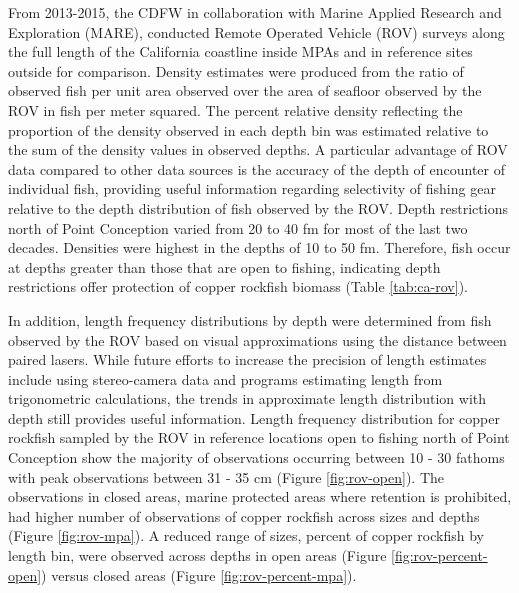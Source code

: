 \documentclass[11pt,
  english,
  a4paper,
]{article}
\begin{document}
\leavevmode\tagmcend\tagstructend


From 2013-2015, the CDFW in collaboration with Marine Applied Research and Exploration (MARE), conducted Remote Operated Vehicle (ROV) surveys along the full length of the California coastline inside MPAs and in reference sites outside for comparison. Density estimates were produced from the ratio of observed fish per unit area observed over the area of seafloor observed by the ROV in fish per meter squared. The percent relative density reflecting the proportion of the density observed in each depth bin was estimated relative to the sum of the density values in observed depths. A particular advantage of ROV data compared to other data sources is the accuracy of the depth of encounter of individual fish, providing useful information regarding selectivity of fishing gear relative to the depth distribution of fish observed by the ROV. Depth restrictions north of Point Conception varied from 20 to 40 fm for most of the last two decades. Densities were highest in the depths of 10 to 50 fm. Therefore, fish occur at depths greater than those that are open to fishing, indicating depth restrictions offer protection of copper rockfish biomass (Table \ref{tab:ca-rov}).

\leavevmode\tagmcend\tagstructend\par


In addition, length frequency distributions by depth were determined from fish observed by the ROV based on visual approximations using the distance between paired lasers. While future efforts to increase the precision of length estimates include using stereo-camera data and programs estimating length from trigonometric calculations, the trends in approximate length distribution with depth still provides useful information. Length frequency distribution for copper rockfish sampled by the ROV in reference locations open to fishing north of Point Conception show the majority of observations occurring between 10 - 30 fathoms with peak observations between 31 - 35 cm (Figure \ref{fig:rov-open}). The observations in closed areas, marine protected areas where retention is prohibited, had higher number of observations of copper rockfish across sizes and depths (Figure \ref{fig:rov-mpa}). A reduced range of sizes, percent of copper rockfish by length bin, were observed across depths in open areas (Figure \ref{fig:rov-percent-open}) versus closed areas (Figure \ref{fig:rov-percent-mpa}).
\end{document}
